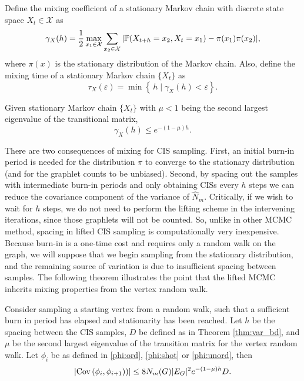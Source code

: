 \begin{definition}
  Define the mixing coefficient of a stationary Markov chain with discrete state space $X_t \in \mathcal X$ as
  \begin{equation}
  \label{eq:gamma}
      \gamma_X(h) = \frac{1}{2}\max_{x_1\in \mathcal X} \sum_{x_2 \in \mathcal X} |\P(X_{t+h} = x_2, X_t = x_1) - \pi(x_1) \pi(x_2)|,
  \end{equation}
  where $\pi(x)$ is the stationary distribution of the Markov chain.
  Also, define the mixing time of a stationary Markov chain $\{X_t\}$ as
  \begin{equation}
      \tau_X(\varepsilon) = \min\left\{\, h \mid \gamma_X(h) < \varepsilon  \right\}.
  \end{equation}
\end{definition}

\begin{theorem}\cite{Sinclair1992}
  Given stationary Markov chain $\{X_t\}$ with $\mu < 1$ being the second largest eigenvalue of the transitional matrix,
  \begin{equation}
      \gamma_X(h) \leq e^{-(1-\mu)h}.
  \end{equation}
\end{theorem}

There are two consequences of mixing for CIS sampling.
First, an initial burn-in period is needed for the distribution $\pi$ to converge to the stationary distribution (and for the graphlet counts to be unbiased).
Second, by spacing out the samples with intermediate burn-in periods and only obtaining CISs every $h$ steps we can reduce the covariance component of the variance of $\hat N_m$.
Critically, if we wish to wait for $h$ steps, we do not need to perform the lifting scheme in the intervening iterations, since those graphlets will not be counted.
So, unlike in other MCMC method, spacing in lifted CIS sampling is computationally very inexpensive.
Because burn-in is a one-time cost and requires only a random walk on the graph, we will suppose that we begin sampling from the stationary distribution, and the remaining source of variation is due to insufficient spacing between samples.
The following theorem illustrates the point that the lifted MCMC inherits mixing properties from the vertex random walk.

\begin{theorem}
\label{thm:cor_bd}
Consider sampling a starting vertex from a random walk, such that a sufficient burn in period has elapsed and stationarity has been reached.
Let $h$ be the spacing between the CIS samples, $D$ be defined as in Theorem \ref{thm:var_bd}, and $\mu$ be the second largest eigenvalue of the transition matrix for the vertex random walk.
Let $\phi_i$ be as defined in \eqref{phi:ord}, \eqref{phi:shot} or \eqref{phi:unord}, then
\begin{equation*}
    \left\vert \mathrm{Cov}\left(\phi_i, \phi_{i+1})\right)\right\vert \leq
    8 N_m(G)|E_G|^2 e^{- (1-\mu) h} D.
\end{equation*}
\end{theorem}


